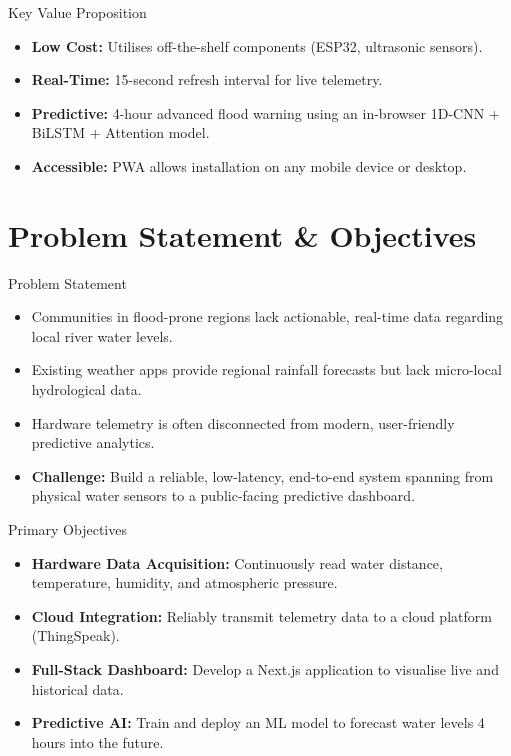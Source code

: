 \documentclass[aspectratio=169]{beamer}
\begin{document}
\begin{frame}{Key Value Proposition}
  \begin{itemize}
    \item \textbf{Low Cost:} Utilises off-the-shelf components (ESP32, ultrasonic sensors).
    \item \textbf{Real-Time:} 15-second refresh interval for live telemetry.
    \item \textbf{Predictive:} 4-hour advanced flood warning using an in-browser 1D-CNN + BiLSTM + Attention model.
    \item \textbf{Accessible:} PWA allows installation on any mobile device or desktop.
  \end{itemize}
\end{frame}

\section{Problem Statement \& Objectives}

\begin{frame}{Problem Statement}
  \begin{itemize}
    \item Communities in flood-prone regions lack actionable, real-time data regarding local river water levels.
    \item Existing weather apps provide regional rainfall forecasts but lack micro-local hydrological data.
    \item Hardware telemetry is often disconnected from modern, user-friendly predictive analytics.
    \item \textbf{Challenge:} Build a reliable, low-latency, end-to-end system spanning from physical water sensors to a public-facing predictive dashboard.
  \end{itemize}
\end{frame}

\begin{frame}{Primary Objectives}
  \begin{itemize}
    \item \textbf{Hardware Data Acquisition:} Continuously read water distance, temperature, humidity, and atmospheric pressure.
    \item \textbf{Cloud Integration:} Reliably transmit telemetry data to a cloud platform (ThingSpeak).
    \item \textbf{Full-Stack Dashboard:} Develop a Next.js application to visualise live and historical data.
    \item \textbf{Predictive AI:} Train and deploy an ML model to forecast water levels 4 hours into the future.
  \end{itemize}
\end{frame}
\end{document}
